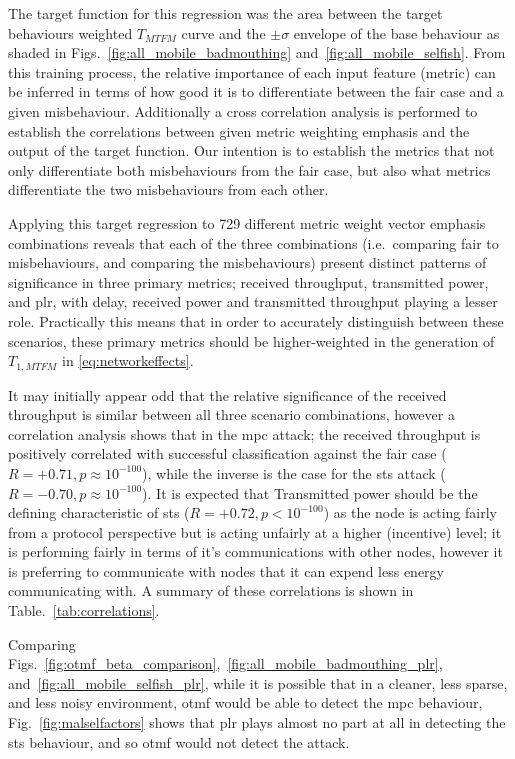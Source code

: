 The target function for this regression was the area between the target behaviours weighted $T_{MTFM}$ curve and the $\pm\sigma$ envelope of the base behaviour as shaded in Figs.~\ref{fig:all_mobile_badmouthing} and~\ref{fig:all_mobile_selfish}.
From this training process, the relative importance of each input feature (metric) can be inferred in terms of how good it is to differentiate between the fair case and a given misbehaviour.
Additionally a cross correlation analysis is performed to establish the correlations between given metric weighting emphasis and the output of the target function.
Our intention is to establish the metrics that not only differentiate both misbehaviours from the fair case, but also what metrics differentiate the two misbehaviours from each other.

Applying this target regression to 729 different metric weight vector emphasis combinations reveals that each of the three combinations (i.e.\ comparing fair to misbehaviours, and comparing the misbehaviours) present distinct patterns of significance in three primary metrics; received throughput, transmitted power, and \gls{plr}, with delay, received power and transmitted throughput playing a lesser role.
Practically this means that in order to accurately distinguish between these scenarios, these primary metrics should be higher-weighted in the generation of $T_{1,MTFM}$ in \autoref{eq:networkeffects}.

It may initially appear odd that the relative significance of the received throughput is similar between all three scenario combinations, however a correlation analysis shows that in the \gls{mpc} attack; the received throughput is positively correlated with successful classification against the fair case ($R=+0.71, p\approx10^{-100}$), while the inverse is the case for the \gls{sts} attack ($R=-0.70, p\approx10^{-100}$).
It is expected that Transmitted power should be the defining characteristic of \gls{sts} ($R=+0.72, p<10^{-100}$) as the node is acting fairly from a protocol perspective but is acting unfairly at a higher (incentive) level; it is performing fairly in terms of it's communications with other nodes, however it is preferring to communicate with nodes that it can expend less energy communicating with.
A summary of these correlations is shown in Table.~\ref{tab:correlations}.

Comparing Figs.~\ref{fig:otmf_beta_comparison},~\ref{fig:all_mobile_badmouthing_plr}, and~\ref{fig:all_mobile_selfish_plr}, while it is possible that in a cleaner, less sparse, and less noisy environment, \gls{otmf} would be able to detect the \gls{mpc} behaviour, Fig.~\ref{fig:malselfactors} shows that \gls{plr} plays almost no part at all in detecting the \gls{sts} behaviour, and so \gls{otmf} would not detect the attack.

